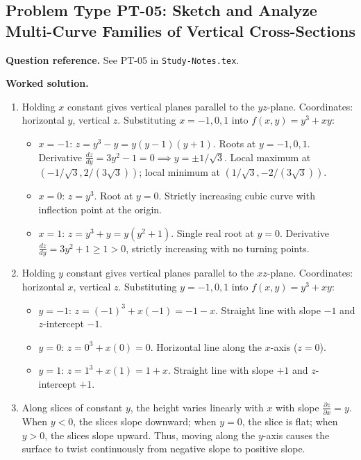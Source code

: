 \documentclass[11pt,letterpaper]{article}
\begin{document}
\subsection{Problem Type PT-05: Sketch and Analyze Multi-Curve Families of Vertical Cross-Sections}
\textbf{Question reference.} See PT-05 in \texttt{Study-Notes.tex}.

\textbf{Worked solution.}
\begin{enumerate}[label=(\alph*),leftmargin=*]
    \item Holding $x$ constant gives vertical planes parallel to the $yz$-plane. Coordinates: horizontal $y$, vertical $z$.
    Substituting $x = -1, 0, 1$ into $f(x,y) = y^3 + xy$:
    \begin{itemize}[nosep]
        \item $x = -1$: $z = y^3 - y = y(y-1)(y+1)$. Roots at $y = -1, 0, 1$. Derivative $\frac{dz}{dy} = 3y^2 - 1 = 0 \implies y = \pm 1/\sqrt{3}$. Local maximum at $(-1/\sqrt{3}, 2/(3\sqrt{3}))$; local minimum at $(1/\sqrt{3}, -2/(3\sqrt{3}))$.
        \item $x = 0$: $z = y^3$. Root at $y=0$. Strictly increasing cubic curve with inflection point at the origin.
        \item $x = 1$: $z = y^3 + y = y(y^2+1)$. Single real root at $y=0$. Derivative $\frac{dz}{dy} = 3y^2+1 \ge 1 > 0$, strictly increasing with no turning points.
    \end{itemize}
    \item Holding $y$ constant gives vertical planes parallel to the $xz$-plane. Coordinates: horizontal $x$, vertical $z$.
    Substituting $y = -1, 0, 1$ into $f(x,y) = y^3 + xy$:
    \begin{itemize}[nosep]
        \item $y = -1$: $z = (-1)^3 + x(-1) = -1 - x$. Straight line with slope $-1$ and $z$-intercept $-1$.
        \item $y = 0$: $z = 0^3 + x(0) = 0$. Horizontal line along the $x$-axis ($z=0$).
        \item $y = 1$: $z = 1^3 + x(1) = 1 + x$. Straight line with slope $+1$ and $z$-intercept $+1$.
    \end{itemize}
    \item Along slices of constant $y$, the height varies linearly with $x$ with slope $\frac{\partial z}{\partial x} = y$. When $y < 0$, the slices slope downward; when $y = 0$, the slice is flat; when $y > 0$, the slices slope upward. Thus, moving along the $y$-axis causes the surface to twist continuously from negative slope to positive slope.
\end{enumerate}
\end{document}
